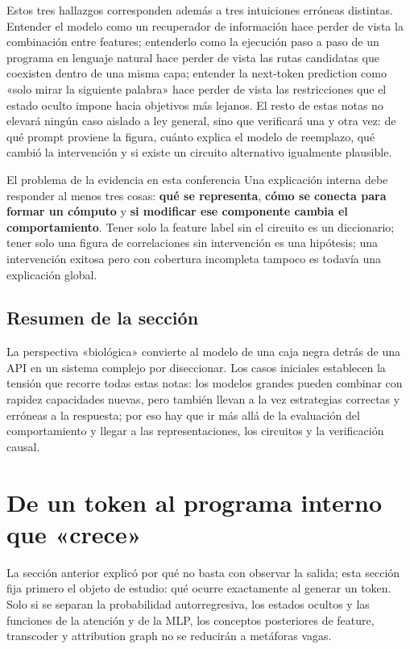 \documentclass[a4paper]{article}
\begin{document}
Estos tres hallazgos corresponden además a tres intuiciones erróneas distintas. Entender el modelo como un recuperador de información hace perder de vista la combinación entre features; entenderlo como la ejecución paso a paso de un programa en lenguaje natural hace perder de vista las rutas candidatas que coexisten dentro de una misma capa; entender la next-token prediction como «solo mirar la siguiente palabra» hace perder de vista las restricciones que el estado oculto impone hacia objetivos más lejanos. El resto de estas notas no elevará ningún caso aislado a ley general, sino que verificará una y otra vez: de qué prompt proviene la figura, cuánto explica el modelo de reemplazo, qué cambió la intervención y si existe un circuito alternativo igualmente plausible.

\begin{importantbox}{El problema de la evidencia en esta conferencia}
Una explicación interna debe responder al menos tres cosas: \textbf{qué se representa}, \textbf{cómo se conecta para formar un cómputo} y \textbf{si modificar ese componente cambia el comportamiento}. Tener solo la feature label sin el circuito es un diccionario; tener solo una figura de correlaciones sin intervención es una hipótesis; una intervención exitosa pero con cobertura incompleta tampoco es todavía una explicación global.
\end{importantbox}

\subsection{Resumen de la sección}

La perspectiva «biológica» convierte al modelo de una caja negra detrás de una API en un sistema complejo por diseccionar. Los casos iniciales establecen la tensión que recorre todas estas notas: los modelos grandes pueden combinar con rapidez capacidades nuevas, pero también llevan a la vez estrategias correctas y erróneas a la respuesta; por eso hay que ir más allá de la evaluación del comportamiento y llegar a las representaciones, los circuitos y la verificación causal.
\section{De un token al programa interno que «crece»}

La sección anterior explicó por qué no basta con observar la salida; esta sección fija primero el objeto de estudio: qué ocurre exactamente al generar un token. Solo si se separan la probabilidad autorregresiva, los estados ocultos y las funciones de la atención y de la MLP, los conceptos posteriores de feature, transcoder y attribution graph no se reducirán a metáforas vagas.
\end{document}
